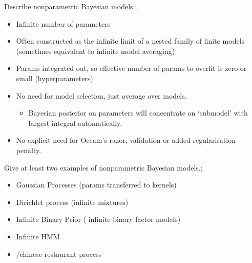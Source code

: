 \documentclass{article}
\begin{document}
Describe nonparametric Bayesian models.; \begin{itemize} \item Infinite number of parameters \item Often constructed as the infinite limit of a nested family of finite models (sometimes equivalent to infinite model averaging) \item Params integrated out, so effective number of params to overfit is zero or small (hyperparameters) \item No need for model selection, just average over models. \begin{itemize} \item Bayesian posterior on parameters will concentrate on `submodel' with largest integral automatically.  \end{itemize} \item No explicit need for Occam's razor, validation or added regularisation penalty.  \end{itemize}

Give at least two examples of nonparametric Bayesian models.; \begin{itemize} \item Gaussian Processes (params transferred to kernels) \item Dirichlet process (infinite mixtures) \item Infinite Binary Prior ( infinite binary factor models) \item Infinite HMM \item /chinese restaurant process \end{itemize}
\end{document}
